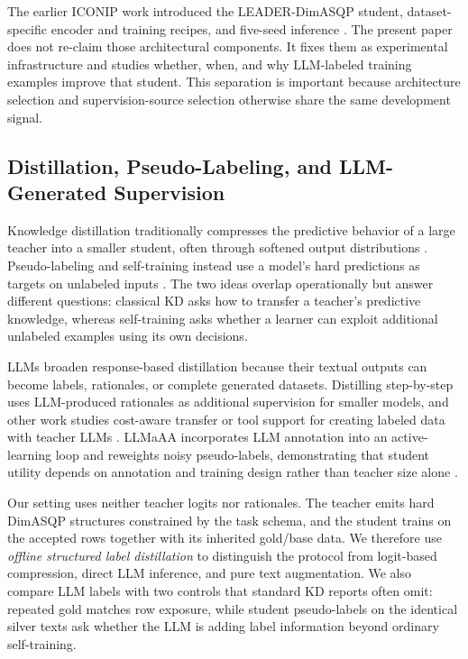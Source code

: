 The earlier ICONIP work introduced the LEADER-DimASQP student,
dataset-specific encoder and training recipes, and five-seed inference
\citep{qin2026leader}. The present paper does not re-claim those
architectural components. It fixes them as experimental infrastructure
and studies whether, when, and why LLM-labeled training examples improve
that student. This separation is important because architecture
selection and supervision-source selection otherwise share the same
development signal.

\subsection{Distillation, Pseudo-Labeling, and LLM-Generated
Supervision}\label{distillation-pseudo-labeling-and-llm-generated-supervision}

Knowledge distillation traditionally compresses the predictive behavior
of a large teacher into a smaller student, often through softened output
distributions \citep{hinton2015distilling}. Pseudo-labeling and
self-training instead use a model's hard predictions as targets on
unlabeled inputs \citep{lee2013pseudolabel}. The two ideas overlap
operationally but answer different questions: classical KD asks how to
transfer a teacher's predictive knowledge, whereas self-training asks
whether a learner can exploit additional unlabeled examples using its
own decisions.

LLMs broaden response-based distillation because their textual outputs
can become labels, rationales, or complete generated datasets.
Distilling step-by-step uses LLM-produced rationales as additional
supervision for smaller models, and other work studies cost-aware
transfer or tool support for creating labeled data with teacher LLMs
\citep{hsieh2023distilling,dasgupta2023cost,golde2023fabricator}. LLMaAA
incorporates LLM annotation into an active-learning loop and reweights
noisy pseudo-labels, demonstrating that student utility depends on
annotation and training design rather than teacher size alone
\citep{zhang2023llmaaa}.

Our setting uses neither teacher logits nor rationales. The teacher
emits hard DimASQP structures constrained by the task schema, and the
student trains on the accepted rows together with its inherited
gold/base data. We therefore use \emph{offline structured label
distillation} to distinguish the protocol from logit-based compression,
direct LLM inference, and pure text augmentation. We also compare LLM
labels with two controls that standard KD reports often omit: repeated
gold matches row exposure, while student pseudo-labels on the identical
silver texts ask whether the LLM is adding label information beyond
ordinary self-training.

